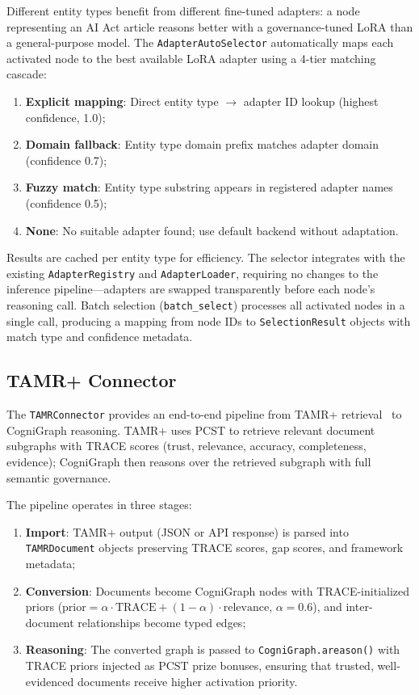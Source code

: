 \documentclass[a4paper,11pt]{article}
\theoremstyle{definition}
\begin{document}
Different entity types benefit from different fine-tuned adapters: a node representing an AI Act article reasons better with a governance-tuned LoRA than a general-purpose model.
The \texttt{AdapterAutoSelector} automatically maps each activated node to the best available LoRA adapter using a 4-tier matching cascade:

\begin{enumerate}
\item \textbf{Explicit mapping}: Direct entity type $\to$ adapter ID lookup (highest confidence, 1.0);
\item \textbf{Domain fallback}: Entity type domain prefix matches adapter domain (confidence 0.7);
\item \textbf{Fuzzy match}: Entity type substring appears in registered adapter names (confidence 0.5);
\item \textbf{None}: No suitable adapter found; use default backend without adaptation.
\end{enumerate}

Results are cached per entity type for efficiency.
The selector integrates with the existing \texttt{AdapterRegistry} and \texttt{AdapterLoader}, requiring no changes to the inference pipeline—adapters are swapped transparently before each node's reasoning call.
Batch selection (\texttt{batch\_select}) processes all activated nodes in a single call, producing a mapping from node IDs to \texttt{SelectionResult} objects with match type and confidence metadata.

\subsection{TAMR+ Connector}
\label{sec:tamr_connector}

The \texttt{TAMRConnector} provides an end-to-end pipeline from TAMR+ retrieval~\cite{tamrplus2026} to CogniGraph reasoning.
TAMR+ uses PCST to retrieve relevant document subgraphs with TRACE scores (trust, relevance, accuracy, completeness, evidence);
CogniGraph then reasons over the retrieved subgraph with full semantic governance.

The pipeline operates in three stages:
\begin{enumerate}
\item \textbf{Import}: TAMR+ output (JSON or API response) is parsed into \texttt{TAMRDocument} objects preserving TRACE scores, gap scores, and framework metadata;
\item \textbf{Conversion}: Documents become CogniGraph nodes with TRACE-initialized priors ($\text{prior} = \alpha \cdot \text{TRACE} + (1-\alpha) \cdot \text{relevance}$, $\alpha = 0.6$), and inter-document relationships become typed edges;
\item \textbf{Reasoning}: The converted graph is passed to \texttt{CogniGraph.areason()} with TRACE priors injected as PCST prize bonuses, ensuring that trusted, well-evidenced documents receive higher activation priority.
\end{enumerate}
\end{document}

